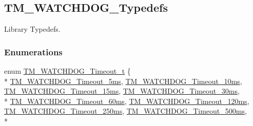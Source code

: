 \hypertarget{group___t_m___w_a_t_c_h_d_o_g___typedefs}{}\subsection{T\+M\+\_\+\+W\+A\+T\+C\+H\+D\+O\+G\+\_\+\+Typedefs}
\label{group___t_m___w_a_t_c_h_d_o_g___typedefs}


Library Typedefs.  


\subsubsection*{Enumerations}
\begin{DoxyCompactItemize}
\item 
enum \hyperlink{group___t_m___w_a_t_c_h_d_o_g___typedefs_ga3c9514e409e8cc70048b868ca9a64671}{T\+M\+\_\+\+W\+A\+T\+C\+H\+D\+O\+G\+\_\+\+Timeout\+\_\+t} \{ \\*
\hyperlink{group___t_m___w_a_t_c_h_d_o_g___typedefs_gga3c9514e409e8cc70048b868ca9a64671a764ef29a2656c829c98f2d78dc549d43}{T\+M\+\_\+\+W\+A\+T\+C\+H\+D\+O\+G\+\_\+\+Timeout\+\_\+5ms}, 
\hyperlink{group___t_m___w_a_t_c_h_d_o_g___typedefs_gga3c9514e409e8cc70048b868ca9a64671a7bbd32ffec01b6a95f4f71edb000b861}{T\+M\+\_\+\+W\+A\+T\+C\+H\+D\+O\+G\+\_\+\+Timeout\+\_\+10ms}, 
\hyperlink{group___t_m___w_a_t_c_h_d_o_g___typedefs_gga3c9514e409e8cc70048b868ca9a64671a8f990a8259213c4d2500ba221a1b73ac}{T\+M\+\_\+\+W\+A\+T\+C\+H\+D\+O\+G\+\_\+\+Timeout\+\_\+15ms}, 
\hyperlink{group___t_m___w_a_t_c_h_d_o_g___typedefs_gga3c9514e409e8cc70048b868ca9a64671a17a2e91a073e2ff292e2f4412b7fd04b}{T\+M\+\_\+\+W\+A\+T\+C\+H\+D\+O\+G\+\_\+\+Timeout\+\_\+30ms}, 
\\*
\hyperlink{group___t_m___w_a_t_c_h_d_o_g___typedefs_gga3c9514e409e8cc70048b868ca9a64671a1b82d78d2e7dcbe39b9182aa3a3860b7}{T\+M\+\_\+\+W\+A\+T\+C\+H\+D\+O\+G\+\_\+\+Timeout\+\_\+60ms}, 
\hyperlink{group___t_m___w_a_t_c_h_d_o_g___typedefs_gga3c9514e409e8cc70048b868ca9a64671a7de64610008ce6a16fdb7787a944ccbd}{T\+M\+\_\+\+W\+A\+T\+C\+H\+D\+O\+G\+\_\+\+Timeout\+\_\+120ms}, 
\hyperlink{group___t_m___w_a_t_c_h_d_o_g___typedefs_gga3c9514e409e8cc70048b868ca9a64671ab4090a7f35ab14b8f10e58a9cf287ed5}{T\+M\+\_\+\+W\+A\+T\+C\+H\+D\+O\+G\+\_\+\+Timeout\+\_\+250ms}, 
\hyperlink{group___t_m___w_a_t_c_h_d_o_g___typedefs_gga3c9514e409e8cc70048b868ca9a64671afd9f485930deba69e725472106491094}{T\+M\+\_\+\+W\+A\+T\+C\+H\+D\+O\+G\+\_\+\+Timeout\+\_\+500ms}, 
\\*

\end{DoxyCompactItemize}

